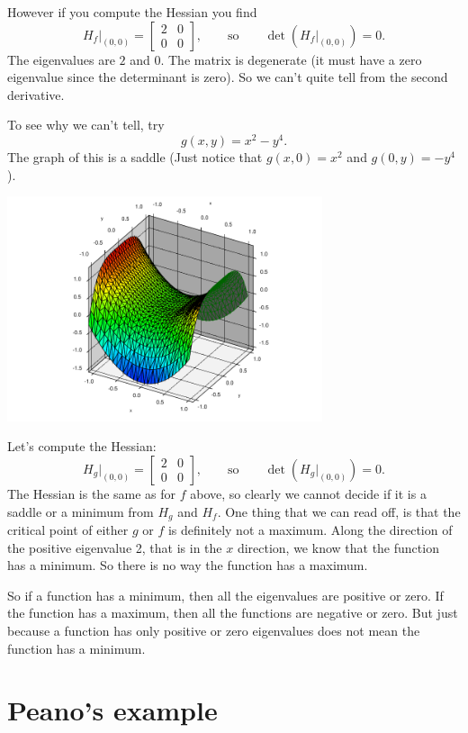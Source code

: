 \documentclass[12pt]{article}
\begin{document}
However if you compute the Hessian  you find
\[
H_f\big|_{(0,0)} =
\begin{bmatrix}
2 & 0 \\
0 & 0
\end{bmatrix} ,
\qquad \text{so} \qquad
\det(H_f\big|_{(0,0)}) = 0 .
\]
The eigenvalues are $2$ and $0$.
The matrix is degenerate (it must have a zero eigenvalue since the
determinant is zero).  So we can't quite tell from the second derivative.

To see why we can't tell, try
\[
g(x,y) = x^2 - y^4 .
\]
The graph of this is a saddle (Just notice that $g(x,0) = x^2$ and
$g(0,y) = -y^4$).
\begin{center}
\includegraphics[width=3.65in]{degenerate-saddle.pdf}
\end{center}

Let's compute the Hessian:
\[
H_g\big|_{(0,0)} =
\begin{bmatrix}
2 & 0 \\
0 & 0
\end{bmatrix}
,
\qquad \text{so} \qquad
\det(H_g\big|_{(0,0)}) = 0 .
\]
The Hessian is the same as for $f$ above, so clearly we cannot decide
if it is a saddle or a minimum
from $H_g$ and $H_f$.  One thing that we can read off, is that the critical
point of either $g$ or $f$ is definitely not a maximum.
Along the direction of the positive eigenvalue 2, that is in the $x$
direction, we know that the function
has a minimum.  So there is no way the function has a maximum.

So if a function has a minimum, then all the eigenvalues are positive or
zero.  If the function has a maximum, then all the functions are negative or
zero.  But just because a function has only positive or zero eigenvalues
does not mean the function has a minimum.

\section*{Peano's example}
\end{document}
